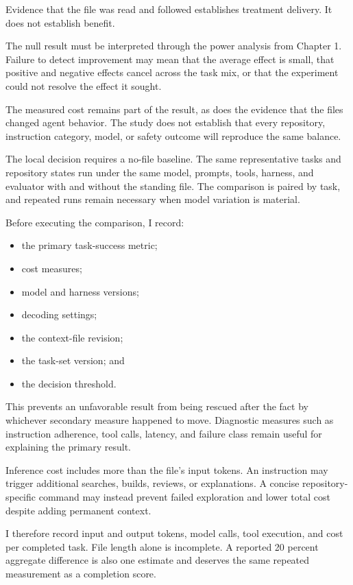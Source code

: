 Evidence that the file was read and followed establishes treatment delivery. It does not establish benefit.

The null result must be interpreted through the power analysis from Chapter 1. Failure to detect improvement may mean that the average effect is small, that positive and negative effects cancel across the task mix, or that the experiment could not resolve the effect it sought.

The measured cost remains part of the result, as does the evidence that the files changed agent behavior. The study does not establish that every repository, instruction category, model, or safety outcome will reproduce the same balance.

The local decision requires a no-file baseline. The same representative tasks and repository states run under the same model, prompts, tools, harness, and evaluator with and without the standing file. The comparison is paired by task, and repeated runs remain necessary when model variation is material.

Before executing the comparison, I record:

\begin{itemize}
\tightlist
\item
  the primary task-success metric;
\item
  cost measures;
\item
  model and harness versions;
\item
  decoding settings;
\item
  the context-file revision;
\item
  the task-set version; and
\item
  the decision threshold.
\end{itemize}

This prevents an unfavorable result from being rescued after the fact by whichever secondary measure happened to move. Diagnostic measures such as instruction adherence, tool calls, latency, and failure class remain useful for explaining the primary result.

Inference cost includes more than the file's input tokens. An instruction may trigger additional searches, builds, reviews, or explanations. A concise repository-specific command may instead prevent failed exploration and lower total cost despite adding permanent context.

I therefore record input and output tokens, model calls, tool execution, and cost per completed task. File length alone is incomplete. A reported 20 percent aggregate difference is also one estimate and deserves the same repeated measurement as a completion score.

